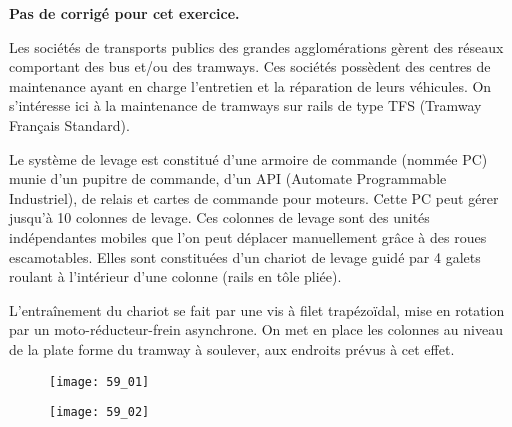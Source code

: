 \normaltrue \difficilefalse \tdifficilefalse
\correctionfalse

\setcounter{numques}{0}

\ifcorrection
\else
\textbf{Pas de corrigé pour cet exercice.}
\fi

\ifprof
\else

Les sociétés de transports publics des grandes agglomérations gèrent des réseaux comportant des
bus et/ou des tramways. Ces sociétés possèdent des centres de maintenance ayant en charge
l’entretien et la réparation de leurs véhicules. %
On s'intéresse ici à la maintenance de tramways sur rails de type
TFS (Tramway Français Standard).


Le système de levage est constitué d’une armoire de commande (nommée PC) munie d’un pupitre
de commande, d’un API (Automate Programmable Industriel), de relais et cartes de commande
pour moteurs. Cette PC peut gérer jusqu’à 10 colonnes de levage. Ces colonnes de levage sont des unités indépendantes mobiles que l’on peut déplacer manuellement
grâce à des roues escamotables. Elles sont constituées d’un chariot de levage guidé par 4 galets roulant à l’intérieur d’une colonne (rails
en tôle pliée). 




L’entraînement du chariot se fait par une vis à filet trapézoïdal, mise en rotation par un moto-réducteur-frein asynchrone. On met en place les colonnes au
niveau de la plate forme du tramway à soulever, aux endroits prévus à cet effet.


\begin{multicols}{2}
\begin{figure}[H]
\centering
\texttt{[image: 59\_01]}
\end{figure}

\begin{figure}[H]
\centering
\texttt{[image: 59\_02]}
\end{figure}

\end{multicols}

